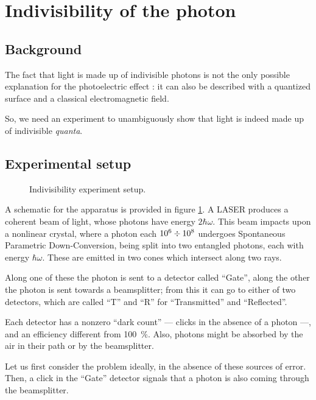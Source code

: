 \documentclass[main.tex]{subfiles}
\begin{document}
\section{Indivisibility of the photon}

\subsection{Background}

The fact that light is made up of indivisible photons is not the only possible explanation for the photoelectric effect \cite[]{thornObservingQuantumBehavior2004}: it can also be described with a quantized surface and a classical electromagnetic field. 

So, we need an experiment to unambiguously show that light is indeed made up of indivisible \emph{quanta}.

\subsection{Experimental setup}

\begin{figure}[ht]
\centering

\caption{Indivisibility experiment setup.}
\label{fig:spdc}
\end{figure}

A schematic for the apparatus is provided in figure \ref{fig:spdc}. 
A LASER produces a coherent beam of light, whose photons have energy \(2 \hbar \omega  \). This beam impacts upon a nonlinear crystal, where a photon each \(\num{e6} \divisionsymbol \num{e8}\) undergoes Spontaneous Parametric Down-Conversion, being split into two entangled photons, each with energy \(\hbar \omega \). 
These are emitted in two cones which intersect along two rays. 

Along one of these the photon is sent to a detector called ``Gate'', along the other the photon is sent towards a beamsplitter; from this it can go to either of two detectors, which are called ``T'' and ``R'' for ``Transmitted'' and ``Reflected''.

Each detector has a nonzero ``dark count'' --- clicks in the absence of a photon ---, and an efficiency different from \SI{100}{\percent}. Also, photons might be absorbed by the air in their path or by the beamsplitter.

Let us first consider the problem ideally, in the absence of these sources of error.
Then, a click in the ``Gate'' detector signals that a photon is also coming through the beamsplitter. 
\end{document}
